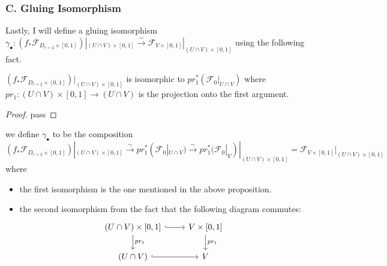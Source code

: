 \subsubsection{C. Gluing Isomorphism}
Lastly, I will define a gluing isomorphism $\gamma_\bullet : (f_*\mathscr{F}_{D_{r=2}\times [0,1]})|_{(U\cap V)\times [0,1]} \xrightarrow{\sim} \mathscr{F}_{V\times [0,1]}|_{(U\cap V)\times [0,1]}$ using the following fact.
\begin{proposition}
$(f_*\mathscr{F}_{D_{r=2}\times [0,1]})|_{(U\cap V)\times[0,1]}$ is isomorphic to $pr_1^*(\mathscr{F}_0|_{U\cap V})$ where $pr_1 : (U\cap V) \times [0,1] \rightarrow (U\cap V)$ is the projection onto the first argument.
\end{proposition}
\begin{proof}
pass
\end{proof}
\begin{definition}
we define $\gamma_\bullet$ to be the composition 
\[
(f_*\mathscr{F}_{D_{r=2}\times [0,1]})|_{(U\cap V)\times [0,1]}\xrightarrow{\sim}pr_1^*(\mathscr{F}_0|_{U\cap V})\xrightarrow{\sim}pr_1^*(\mathscr{F}_0|_{V})|_{(U\cap V)\times [0,1]}=\mathscr{F}_{V\times [0,1]}|_{(U\cap V)\times [0,1]}
\]
where
\begin{itemize}
\item the first isomorphism is the one mentioned in the above proposition.

\item the second isomorphism from the fact that the following diagram commutes:
\[
\begin{tikzcd}
(U\cap V)\times [0,1] \arrow[hookrightarrow]{r}\arrow[d, "pr_1"]     & V\times [0,1] \arrow[d, "pr_1"] \\
(U\cap V) \arrow[hookrightarrow]{r} & V 
\end{tikzcd}
\]
\end{itemize}
\end{definition}


